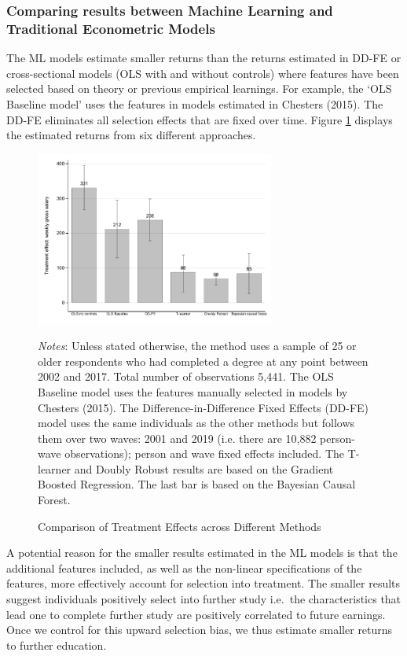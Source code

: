 \documentclass[12pt, a4paper]{article}
\begin{document}
\subsubsection{Comparing results between Machine Learning and Traditional Econometric Models}

The ML models estimate smaller returns than the returns estimated in DD-FE or cross-sectional models (OLS with and without controls) where features have been selected based on theory or previous empirical learnings. For example, the `OLS Baseline model' uses the features in models estimated in Chesters (2015). The DD-FE eliminates all selection effects that are fixed over time. Figure \ref{fig:method} displays the estimated returns from six different approaches.

\singlespacing
\begin{figure}[htbp]
\centering
\caption{Comparison of Treatment Effects across Different Methods}
\vspace{0.5cm}
  \label{fig:method}
    \includegraphics[width=0.7\textwidth]{_figures/method_v2.pdf}
\parbox{1\textwidth}{\footnotesize{\textit{Notes}: Unless stated otherwise, the method uses a sample of 25 or older respondents who had completed a degree at any point between 2002 and 2017. Total number of observations 5,441. The OLS Baseline model uses the features manually selected in models by Chesters (2015). The Difference-in-Difference Fixed Effects (DD-FE) model uses the same individuals as the other methods but follows them over two waves: 2001 and 2019 (i.e. there are 10,882 person-wave observations); person and wave fixed effects included. The T-learner and Doubly Robust results are based on the Gradient Boosted Regression. The last bar is based on the Bayesian Causal Forest.}}
\end{figure}
\doublespacing

A potential reason for the smaller results estimated in the ML models is that the additional features included, as well as the non-linear specifications of the features, more effectively account for selection into treatment. The smaller results suggest individuals positively select into further study i.e.~the characteristics that lead one to complete further study are positively correlated to future earnings. Once we control for this upward selection bias, we thus estimate smaller returns to further education.
\end{document}
